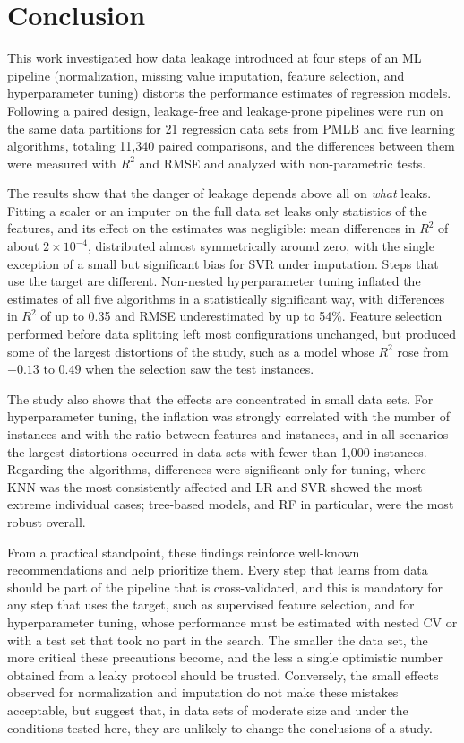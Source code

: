 \chapter{Conclusion}
\label{cap:conclusao}

This work investigated how data leakage introduced at four steps of an ML
pipeline (normalization, missing value imputation, feature selection, and
hyperparameter tuning) distorts the performance estimates of regression models.
Following a paired design, leakage-free and leakage-prone pipelines were run on
the same data partitions for 21 regression data sets from PMLB and five learning
algorithms, totaling 11,340 paired comparisons, and the differences between them
were measured with $R^2$ and RMSE and analyzed with non-parametric tests.

The results show that the danger of leakage depends above all on \emph{what}
leaks. Fitting a scaler or an imputer on the full data set leaks only statistics
of the features, and its effect on the estimates was negligible: mean
differences in $R^2$ of about $2\times10^{-4}$, distributed almost symmetrically
around zero, with the single exception of a small but significant bias for SVR
under imputation. Steps that use the target are different. Non-nested
hyperparameter tuning inflated the estimates of all five algorithms in a
statistically significant way, with differences in $R^2$ of up to 0.35 and RMSE
underestimated by up to 54\%. Feature selection performed before data splitting
left most configurations unchanged, but produced some of the largest distortions
of the study, such as a model whose $R^2$ rose from $-0.13$ to $0.49$ when the
selection saw the test instances.

The study also shows that the effects are concentrated in small data sets. For
hyperparameter tuning, the inflation was strongly correlated with the number of
instances and with the ratio between features and instances, and in all
scenarios the largest distortions occurred in data sets with fewer than 1,000
instances. Regarding the algorithms, differences were significant only for
tuning, where KNN was the most consistently affected and LR and SVR showed the
most extreme individual cases; tree-based models, and RF in particular, were the
most robust overall.

From a practical standpoint, these findings reinforce well-known recommendations
and help prioritize them. Every step that learns from data should be part of the
pipeline that is cross-validated, and this is mandatory for any step that uses
the target, such as supervised feature selection, and for hyperparameter
tuning, whose performance must be estimated with nested CV or with a test set
that took no part in the search. The smaller the data set, the more critical
these precautions become, and the less a single optimistic number obtained from a
leaky protocol should be trusted. Conversely, the small effects observed for
normalization and imputation do not make these mistakes acceptable, but suggest
that, in data sets of moderate size and under the conditions tested here, they
are unlikely to change the conclusions of a study.

